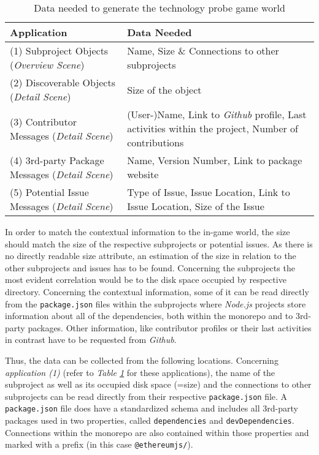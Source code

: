 \begin{table}[h]
  \begin{tabularx}{\textwidth}{| X | X |}
    \hline
    \textbf{Application}                                   & \textbf{Data Needed}                                                                                      \\ \hline
    (1) Subproject Objects (\textit{Overview Scene})       & Name, Size \& Connections to other subprojects                                                            \\ \hline
    (2) Discoverable Objects (\textit{Detail Scene})       & Size of the object                                                                                        \\ \hline
    (3) Contributor Messages (\textit{Detail Scene})       & (User-)Name, Link to \textit{Github} profile, Last activities within the project, Number of contributions \\ \hline
    (4) 3rd-party Package Messages (\textit{Detail Scene}) & Name, Version Number, Link to package website                                                             \\ \hline
    (5) Potential Issue Messages (\textit{Detail Scene})   & Type of Issue, Issue Location, Link to Issue Location, Size of the Issue                                  \\ \hline
  \end{tabularx}
  \caption{\label{tab:probe-data}Data needed to generate the technology probe game world}
\end{table}

In order to match the contextual information to the in-game world, the size should match the size of the respective subprojects or potential issues. As there is no directly readable size attribute, an estimation of the size in relation to the other subprojects and issues has to be found. Concerning the subprojects the most evident correlation would be to the disk space occupied by respective directory. Concerning the contextual information, some of it can be read directly from the \verb|package.json| files within the subprojects where \textit{Node.js} projects store information about all of the dependencies, both within the monorepo and to 3rd-party packages. Other information, like contributor profiles or their last activities in contrast have to be requested from \textit{Github}.

Thus, the data can be collected from the following locations. Concerning \textit{application (1)} (refer to \textit{Table \ref{tab:probe-data}} for these applications), the name of the subproject as well as its occupied disk space (=size) and the connections to other subprojects can be read directly from their respective \verb|package.json| file. A \verb|package.json| file does have a standardized schema and includes all 3rd-party packages used in two properties, called \verb|dependencies| and \verb|devDependencies|. Connections within the monorepo are also contained within those properties and marked with a prefix (in this case \verb|@ethereumjs/|).


